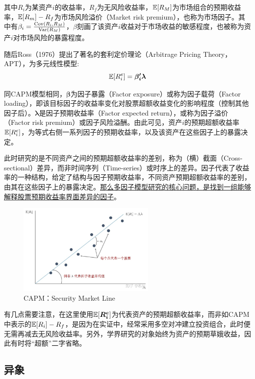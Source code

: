 \documentclass[11pt]{article}
\begin{document}
其中$R_i$为某资产$i$的收益率，$R_f$为无风险收益率，$\mathbb{E}[R_M]$为市场组合的预期收益率，$\mathbb{E}[R_m]- R_f$为市场风险溢价（Market risk premium），也称为市场因子。其中有$\beta_i = \frac{\operatorname{Cov}(R_i,R_M)}{\operatorname{Var}(R_M)}$，$\beta$刻画了该资产$i$收益对于市场收益的敏感程度，也被称为资产$i$对市场风险的暴露程度。

随后Ross（1976）提出了著名的套利定价理论（Arbitrage Pricing Theory，APT），为多元线性模型:
\begin{equation*}
    \mathbb{E}[R_i^e] = \bm{\beta_{i}' \lambda}
\end{equation*}

同CAPM模型相同，$\bm{\beta}$为因子暴露（Factor exposure）或称为因子载荷（Factor loading），即该目标因子的收益率变化对股票超额收益变化的影响程度（控制其他因子后）。$\bm{\lambda}$是因子预期收益率（Factor expected return），或称为因子溢价（Factor risk premium）或因子风险溢酬。由此可见，资产$i$的预期超额收益率$\mathbb{E}[R_i^e]$，为等式右侧一系列因子的预期收益率，以及该资产在这些因子上的暴露决定。

此时研究的是不同资产之间的预期超额收益率的差别，称为（横）截面（Cross-sectional）差异，而非时间序列（Time-series）或时序上的差异。因子代表了收益率的一种结构，给定了结构与因子预期收益率，不同资产预期超额收益率的差别，由其在这些因子上的暴露决定。\uline{那么多因子模型研究的核心问题，是找到一组能够解释股票预期收益率界面差异的因子}。

\begin{figure}[H]
    \centering
    \includegraphics[width=0.6\textwidth]{fig/capm_sml.jpg}
    \caption{CAPM：Security Market Line}
    \label{fig:sml}
\end{figure}

有几点需要注意，在这里使用$\mathbb{E}[\bm{R_i^e}]$为代表资产的预期超额收益率，而非如CAPM中表示的$\mathbb{E}[R_i] - R_f$，是因为在实证中，经常采用多空对冲建立投资组合，此时便无需再减去无风险收益率。另外，学界研究的对象始终为资产的预期草娥收益，因此有时将“超额”二字省略。

\subsection{异象}
\end{document}
